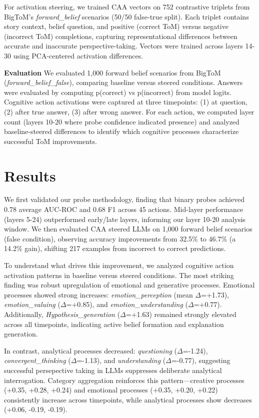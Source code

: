 \documentclass{article}
\begin{document}
For activation steering, we trained CAA vectors \cite{rimsky2023steering,zou2023representation} on 752 contrastive triplets from BigToM's \cite{gandhi2023understanding} \textit{forward\_belief} scenarios (50/50 false-true split). Each triplet contains story context, belief question, and positive (correct ToM) versus negative (incorrect ToM) completions, capturing representational differences between accurate and inaccurate perspective-taking. Vectors were trained across layers 14-30 using PCA-centered activation differences.

\textbf{Evaluation} We evaluated 1,000 forward belief scenarios from BigToM \cite{gandhi2023understanding} (\textit{forward\_belief\_false}), comparing baseline versus steered conditions. Answers were evaluated by computing p(correct) vs p(incorrect) from model logits. Cognitive action activations were captured at three timepoints: (1) at question, (2) after true answer, (3) after wrong answer. For each action, we computed layer count (layers 10-20 where probe confidence indicated presence) and analyzed baseline-steered differences to identify which cognitive processes characterize successful ToM improvements.

\section{Results}

We first validated our probe methodology, finding that binary probes achieved 0.78 average AUC-ROC and 0.68 F1 across 45 actions. Mid-layer performance (layers 5-24) outperformed early/late layers, informing our layer 10-20 analysis window. We then evaluated CAA steered LLMs on 1,000 forward belief scenarios (false condition), observing accuracy improvements from 32.5\% to 46.7\% (a 14.2\% gain), shifting 217 examples from incorrect to correct predictions.

To understand what drives this improvement, we analyzed cognitive action activation patterns in baseline versus steered conditions. The most striking finding was robust upregulation of emotional and generative processes. Emotional processes showed strong increases: \textit{emotion\_perception} (mean $\Delta$=+1.73), \textit{emotion\_valuing} ($\Delta$=+0.85), and \textit{emotion\_understanding} ($\Delta$=+0.77). Additionally, \textit{Hypothesis\_generation} ($\Delta$=+1.63) remained strongly elevated across all timepoints, indicating active belief formation and explanation generation.

In contrast, analytical processes decreased: \textit{questioning} ($\Delta$=-1.24), \textit{convergent\_thinking} ($\Delta$=-1.13), and \textit{understanding} ($\Delta$=-0.77), suggesting successful persepective taking in LLMs suppresses deliberate analytical interrogation. Category aggregation reinforces this pattern—creative processes (+0.35, +0.28, +0.24) and emotional processes (+0.35, +0.20, +0.22) consistently increase across timepoints, while analytical processes show decreases (+0.06, -0.19, -0.19).
\end{document}
